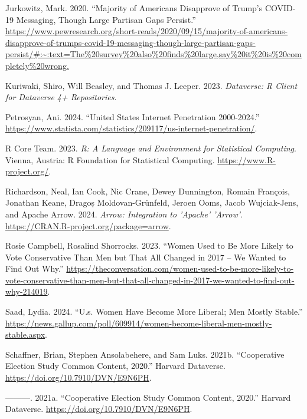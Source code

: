 \documentclass[
  letterpaper,
  DIV=11,
  numbers=noendperiod]{scrartcl}
\newlength{\cslhangindent}
\newlength{\cslentryspacingunit} %
\newenvironment{CSLReferences}[2] %
 {%
  \setlength{\parindent}{0pt}
  \ifodd #1
  \let\oldpar\par
  \def\par{\hangindent=\cslhangindent\oldpar}
  \fi
  \setlength{\parskip}{#2\cslentryspacingunit}
 }%
 {}
\begin{document}
\begin{CSLReferences}{1}{0}
\leavevmode{}%
Jurkowitz, Mark. 2020. {``Majority of Americans Disapprove of Trump's
COVID-19 Messaging, Though Large Partisan Gaps Persist.''}
\url{https://www.pewresearch.org/short-reads/2020/09/15/majority-of-americans-disapprove-of-trumps-covid-19-messaging-though-large-partisan-gaps-persist/\#:~:text=The\%20survey\%20also\%20finds\%20large,say\%20it\%20is\%20completely\%20wrong.}

\leavevmode{}%
Kuriwaki, Shiro, Will Beasley, and Thomas J. Leeper. 2023.
\emph{Dataverse: R Client for Dataverse 4+ Repositories}.

\leavevmode{}%
Petrosyan, Ani. 2024. {``United States Internet Penetration
2000-2024.''}
\url{https://www.statista.com/statistics/209117/us-internet-penetration/}.

\leavevmode{}%
R Core Team. 2023. \emph{R: A Language and Environment for Statistical
Computing}. Vienna, Austria: R Foundation for Statistical Computing.
\url{https://www.R-project.org/}.

\leavevmode{}%
Richardson, Neal, Ian Cook, Nic Crane, Dewey Dunnington, Romain
François, Jonathan Keane, Dragoș Moldovan-Grünfeld, Jeroen Ooms, Jacob
Wujciak-Jens, and Apache Arrow. 2024. \emph{Arrow: Integration to
'Apache' 'Arrow'}. \url{https://CRAN.R-project.org/package=arrow}.

\leavevmode{}%
Rosie Campbell, Rosalind Shorrocks. 2023. {``Women Used to Be More
Likely to Vote Conservative Than Men but That All Changed in 2017 -- We
Wanted to Find Out Why.''}
\url{https://theconversation.com/women-used-to-be-more-likely-to-vote-conservative-than-men-but-that-all-changed-in-2017-we-wanted-to-find-out-why-214019}.

\leavevmode{}%
Saad, Lydia. 2024. {``U.s. Women Have Become More Liberal; Men Mostly
Stable.''}
\url{https://news.gallup.com/poll/609914/women-become-liberal-men-mostly-stable.aspx}.

\leavevmode{}%
Schaffner, Brian, Stephen Ansolabehere, and Sam Luks. 2021b.
{``{Cooperative Election Study Common Content, 2020}.''} Harvard
Dataverse. \url{https://doi.org/10.7910/DVN/E9N6PH}.

\leavevmode{}%
---------. 2021a. {``{Cooperative Election Study Common Content,
2020}.''} Harvard Dataverse. \url{https://doi.org/10.7910/DVN/E9N6PH}.


\end{CSLReferences}
\end{document}
